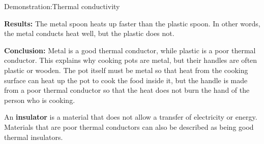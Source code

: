 \begin{gexperiment}{Demonstration:Thermal conductivity}
{\begin{itemize}[noitemsep]
\end{itemize}
        \par 
\label{m38706*eip-270}
	\par
      \label{m38706*id66666}\noindent{}\textbf{Results: }\newline
    The metal spoon heats up faster than the plastic spoon. In other words, the metal conducts heat well, but the plastic does not.\par 
\label{m38706*id66687}\noindent{}\textbf{Conclusion: }Metal is a good thermal conductor, while plastic is a poor thermal conductor. This explains why cooking pots are metal, but their handles are often plastic or wooden. The pot itself must be metal so that heat from the cooking surface can heat up the pot to cook the food inside it, but the handle is made from a poor thermal conductor so that the heat does not burn the hand of the person who is cooking.}
 \par 
      \label{m38706*id66699}An \textbf{insulator} is a material that does not allow a transfer of electricity or energy. Materials that are poor thermal conductors can also be described as being good thermal insulators.\par 

\end{gexperiment}

